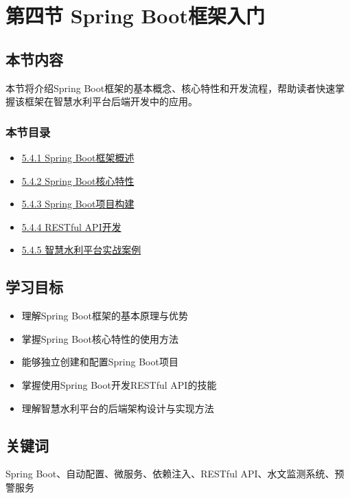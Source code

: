 \section{第四节 Spring
Boot框架入门}\label{ux7b2cux56dbux8282-spring-bootux6846ux67b6ux5165ux95e8}

\subsection{本节内容}\label{ux672cux8282ux5185ux5bb9}

本节将介绍Spring
Boot框架的基本概念、核心特性和开发流程，帮助读者快速掌握该框架在智慧水利平台后端开发中的应用。

\subsubsection{本节目录}\label{ux672cux8282ux76eeux5f55}

\begin{itemize}
\tightlist
\item
  \href{./section05-04/section05-04-01.md}{5.4.1 Spring Boot框架概述}
\item
  \href{./section05-04/section05-04-02.md}{5.4.2 Spring Boot核心特性}
\item
  \href{./section05-04/section05-04-03.md}{5.4.3 Spring Boot项目构建}
\item
  \href{./section05-04/section05-04-04.md}{5.4.4 RESTful API开发}
\item
  \href{./section05-04/section05-04-05.md}{5.4.5 智慧水利平台实战案例}
\end{itemize}

\subsection{学习目标}\label{ux5b66ux4e60ux76eeux6807}

\begin{itemize}
\tightlist
\item
  理解Spring Boot框架的基本原理与优势
\item
  掌握Spring Boot核心特性的使用方法
\item
  能够独立创建和配置Spring Boot项目
\item
  掌握使用Spring Boot开发RESTful API的技能
\item
  理解智慧水利平台的后端架构设计与实现方法
\end{itemize}

\subsection{关键词}\label{ux5173ux952eux8bcd}

Spring Boot、自动配置、微服务、依赖注入、RESTful
API、水文监测系统、预警服务

